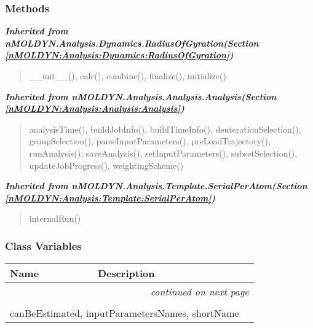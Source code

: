 
  \subsubsection{Methods}


\large{\textbf{\textit{Inherited from nMOLDYN.Analysis.Dynamics.RadiusOfGyration\textit{(Section \ref{nMOLDYN:Analysis:Dynamics:RadiusOfGyration})}}}}

\begin{quote}
\_\_init\_\_(), calc(), combine(), finalize(), initialize()
\end{quote}

\large{\textbf{\textit{Inherited from nMOLDYN.Analysis.Analysis.Analysis\textit{(Section \ref{nMOLDYN:Analysis:Analysis:Analysis})}}}}

\begin{quote}
analysisTime(), buildJobInfo(), buildTimeInfo(), deuterationSelection(), groupSelection(), parseInputParameters(), preLoadTrajectory(), runAnalysis(), saveAnalysis(), setInputParameters(), subsetSelection(), updateJobProgress(), weightingScheme()
\end{quote}

\large{\textbf{\textit{Inherited from nMOLDYN.Analysis.Template.SerialPerAtom\textit{(Section \ref{nMOLDYN:Analysis:Template:SerialPerAtom})}}}}

\begin{quote}
internalRun()
\end{quote}


  \subsubsection{Class Variables}

    \vspace{-1cm}
\hspace{\varindent}\begin{longtable}{|p{\varnamewidth}|p{\vardescrwidth}|l}
\cline{1-2}
\cline{1-2} \centering \textbf{Name} & \centering \textbf{Description}& \\
\cline{1-2}
\endhead\cline{1-2}\multicolumn{3}{r}{\small\textit{continued on next page}}\\\endfoot\cline{1-2}
\endlastfoot\multicolumn{2}{|l|}{\textit{Inherited from nMOLDYN.Analysis.Dynamics.RadiusOfGyration \textit{(Section \ref{nMOLDYN:Analysis:Dynamics:RadiusOfGyration})}}}\\
\multicolumn{2}{|p{\varwidth}|}{\raggedright canBeEstimated, inputParametersNames, shortName}\\
\cline{1-2}
\end{longtable}

